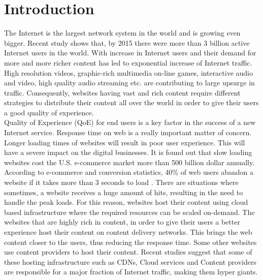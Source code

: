 \section{Introduction\label{cha:chapter1}}

\noindent The Internet is the largest network system in the world and is growing even bigger. Recent study \cite{report} shows that, by 2015 there were more than 3 billion active Internet users in the world. With increase in Internet users and their demand for more and more richer content has led to exponential increase of Internet traffic. High resolution videos, graphic-rich multimedia on-line games, interactive audio and video, high quality audio streaming etc. are contributing to large upsurge in traffic. Consequently, websites having vast and rich content require different strategies to distribute their content all over the world in order to give their users a good quality of experience.\\

\noindent Quality of Experience (QoE) for end users is a key factor in the success of a new Internet service. Response time on web is a really important matter of concern. Longer loading times of websites will result in poor user experience. This will have a severe impact on the digital businesses. It is found out that slow loading websites cost the U.S. e-commerce market more than 500 billion dollar annually. According to e-commerce and conversion statistics, 40\% of web users abandon a website if it takes more than 3 seconds to load \cite{stats}. There are situations where sometimes, a website receives a huge amount of hits, resulting in the need to handle the peak loads. For this reason, websites host their content using cloud based infrastructure where the required resources can be scaled on-demand. The websites that are highly rich in content, in order to give their users a better experience host their content on content delivery networks. This brings the web content closer to the users, thus reducing the response time. Some other websites use content providers  to host their content. Recent studies \cite{Labovitz} \cite{Poese} \cite{Manuel} suggest  that some of these hosting infrastructure such as CDNs, Cloud services and Content providers are responsible for a major fraction of Internet traffic, making them hyper giants.\\

